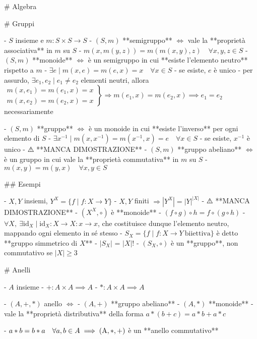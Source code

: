 # Algebra

# Gruppi

- $S$ insieme e $m: S \times S \rightarrow S$
  - $(S, m)$ **semigruppo** $\iff$ vale la **proprietà associativa** in $m$ su $S$
    - $m(x, m(y, z))=m(m(x, y),z) \quad \forall x, y, z \in S$
  - $(S, m)$ **monoide** $\iff$ è un semigruppo in cui **esiste l'elemento neutro** rispetto a $m$
    - $\exists e  \mid m(x, e) = m(e, x) = x \quad \forall x \in S$
    - se esiste, $e$ è unico
        - per assurdo, $\exists e_1, e_2 \mid e_1 \neq e_2$ elementi neutri, allora \( \left.\begin{array}{l}m\left(x, e_{1}\right)=m\left(e_{1}, x\right)=x \\ m\left(x, e_{2}\right)=m\left(e_{2}, x\right)=x\end{array}\right\} \Rightarrow m\left(e_{1}, x\right)=m\left(e_{2}, x\right) \implies e_1=e_2\) necessariamente

  - $(S, m)$ **gruppo** $\iff$ è un monoide in cui **esiste l'inverso** per ogni elemento di $S$
    - $\exists x^{-1} \mid m(x, x^{-1}) =m(x^{-1}, x) =e \quad \forall x \in S$
    - se esiste, $x^{-1}$ è unico
      - ⚠️ **MANCA DIMOSTRAZIONE**
  - $(S, m)$ **gruppo abeliano** $\iff$ è un gruppo in cui vale la **proprietà commutativa** in $m$ su $S$
    - $m(x, y) = m(y, x) \quad \forall x, y \in S$

## Esempi

- $X, Y$ insiemi, $Y^X = \{f \mid f:X \rightarrow Y\}$
  - $X, Y$ finiti $\Rightarrow \left| Y^X \right| = \left| Y \right| ^ {|X|}$
      - ⚠️ **MANCA DIMOSTRAZIONE**
  - $(X^X, \circ)$ è **monoide**
    - \( (f \circ g) \circ h=f \circ(g \circ h) \)
    - $\forall X, \ \exists \textrm{id}_X \mid \textrm{id}_X : X \rightarrow X : x \rightarrow x$, che costituisce dunque l'elemento neutro, mappando ogni elemento in sé stesso
  - $S_X = \{f \mid f : X \rightarrow Y \ \textrm{biiettiva}\}$ è detto **gruppo simmetrico di $X$**
    - $|S_X|$ = $|X|!$
    - $(S_X, \circ)$ è un **gruppo**, non commutativo se $|X| \ge 3$

# Anelli

- $A$ insieme
- $+: A \times A \implies A$
- \( *: A \times A \implies A \)

- \( (A, +, *) \) anello \(\iff  \)
  - $(A, +)$ **gruppo abeliano**
  - $(A, *)$ **monoide**
  - vale la **proprietà distributiva** della forma \(a*(b + c) = a * b + a * c\)

- \( a * b=b * a \quad \forall a, b \in A \implies  \rm (A, *, +)\) è un **anello commutativo**

